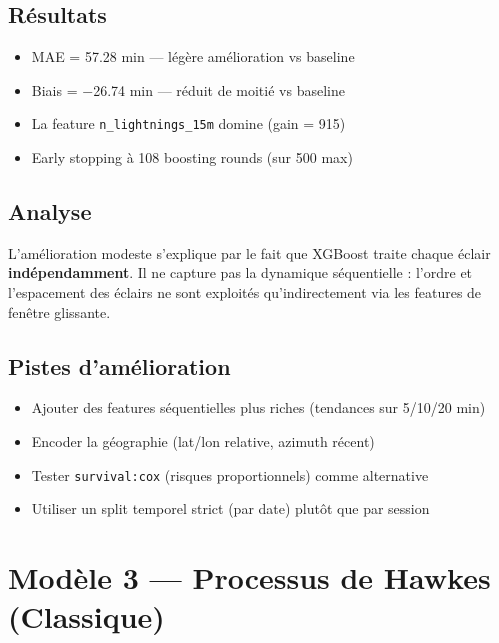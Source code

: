 \documentclass[11pt,a4paper]{article}
\newenvironment{keybox}[1]
  {\begin{tcolorbox}[colback=meteoGray,colframe=meteoBlue,title={\textbf{#1}},
    fonttitle=\small, boxrule=0.6pt, arc=3pt]}
  {\end{tcolorbox}}
\begin{document}
\subsection{Résultats}
\begin{keybox}{Métriques XGBoost AFT}
\begin{itemize}[noitemsep]
  \item MAE = 57.28 min — légère amélioration vs baseline
  \item Biais = $-$26.74 min — réduit de moitié vs baseline
  \item La feature \texttt{n\_lightnings\_15m} domine (gain = 915)
  \item Early stopping à 108 boosting rounds (sur 500 max)
\end{itemize}
\end{keybox}

\subsection{Analyse}
L'amélioration modeste s'explique par le fait que XGBoost traite chaque éclair 
\textbf{indépendamment}. Il ne capture pas la dynamique séquentielle : l'ordre 
et l'espacement des éclairs ne sont exploités qu'indirectement via les features 
de fenêtre glissante.

\subsection{Pistes d'amélioration}
\begin{itemize}[noitemsep]
  \item Ajouter des features séquentielles plus riches (tendances sur 5/10/20 min)
  \item Encoder la géographie (lat/lon relative, azimuth récent)
  \item Tester \texttt{survival:cox} (risques proportionnels) comme alternative
  \item Utiliser un split temporel strict (par date) plutôt que par session
\end{itemize}

\newpage
\section{Modèle 3 — Processus de Hawkes (Classique)}
\end{document}
